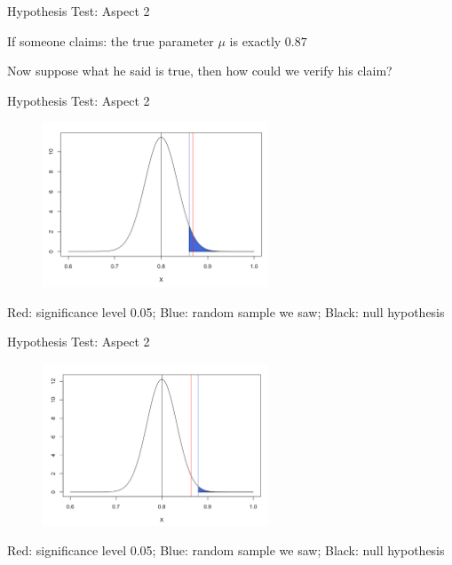 \documentclass[12pt]{beamer}
\begin{document}
\begin{frame}[fragile]{Hypothesis Test: Aspect 2}

If someone claims: the true parameter $\mu$ is exactly $0.87$

Now suppose what he said is true, then how could we verify his claim?

\end{frame}


\begin{frame}[fragile]{Hypothesis Test: Aspect 2}

	\begin{figure}
		\begin{center}
			\includegraphics[width=0.6\textwidth]{figure/f06.png}
		\end{center}
	\end{figure}

Red: significance level 0.05; Blue: random sample we saw; Black: null hypothesis

\end{frame}


\begin{frame}[fragile]{Hypothesis Test: Aspect 2}

	\begin{figure}
		\begin{center}
			\includegraphics[width=0.6\textwidth]{figure/f07.png}
		\end{center}
	\end{figure}

Red: significance level 0.05; Blue: random sample we saw; Black: null hypothesis

\end{frame}
\end{document}
